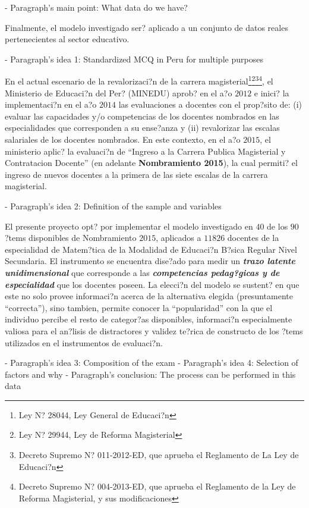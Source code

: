 - Paragraph's main point: What data do we have?

Finalmente, el modelo investigado ser? aplicado a un conjunto de datos reales pertenecientes al sector educativo. 


- Paragraph's idea 1: Standardized MCQ in Peru for multiple purposes

En el actual escenario de la revalorizaci?n de la carrera magisterial\footnote{Ley N? 28044, Ley General de Educaci?n}\footnote{Ley N? 29944, Ley de Reforma Magisterial}\footnote{Decreto Supremo N? 011-2012-ED, que aprueba el Reglamento de La Ley de Educaci?n}\footnote{Decreto Supremo N? 004-2013-ED, que aprueba el Reglamento de la Ley de Reforma Magisterial, y sus modificaciones}, el Ministerio de Educaci?n del Per? (MINEDU) aprob? en el a?o $2012$ e inici? la implementaci?n en el a?o $2014$ las evaluaciones a docentes con el prop?sito de: (i) evaluar las capacidades y/o competencias de los docentes nombrados en las especialidades que corresponden a su ense?anza y (ii) revalorizar las escalas salariales de los docentes nombrados. En este contexto, en el a?o $2015$, el ministerio aplic? la evaluaci?n de ``Ingreso a la Carrera Publica Magisterial y Contratacion Docente'' (en adelante \textbf{Nombramiento 2015}), la cual permiti? el ingreso de nuevos docentes a la primera de las siete escalas de la carrera magisterial.


- Paragraph's idea 2: Definition of the sample and variables

El presente proyecto opt? por implementar el modelo investigado en $40$ de los $90$ ?tems disponibles de Nombramiento $2015$, aplicados a $11826$ docentes de la especialidad de Matem?tica de la Modalidad de Educaci?n B?sica Regular Nivel Secundaria. El instrumento se encuentra dise?ado para medir un \textbf{\textit{trazo latente unidimensional}} que corresponde a las \textbf{\textit{competencias pedag?gicas y de especialidad}} que los docentes poseen. La elecci?n del modelo se sustent? en que este no solo provee informaci?n acerca de la alternativa elegida (presuntamente ``correcta''), sino tambien, permite conocer la ``popularidad'' con la que el individuo percibe el resto de categor?as disponibles, informaci?n especialmente valiosa para el an?lisis de distractores y validez te?rica de constructo de los ?tems utilizados en el instrumentos de evaluaci?n.

- Paragraph's idea 3: Composition of the exam
- Paragraph's idea 4: Selection of factors and why
- Paragraph's conclusion: The process can be performed in this data

